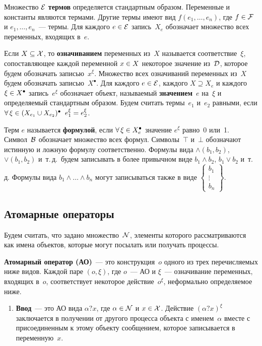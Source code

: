 \begin{multicols}{2}
Множество ${\cal E}$ {\bf термов} определяется стандартным образом.
Переменные и константы являются термами.
Другие термы имеют вид $f(e_1,\ldots, e_n)$, где
$f\hm\in {\cal F}$ и $e_1,\ldots, e_n$~--- термы.
Для каждого $e\hm\in {\cal E}$ запись~$X_e$ обозначает
множество всех переменных, входящих в~$e$.

Если $X\subseteq {\cal X}$, то {\bf означиванием} переменных из~$X$ называется соответствие~$\xi$,
сопоставляющее каж\-дой переменной $x \hm\in X$ некоторое значение из~${\cal D}$,
которое  будем обозначать записью~$x^\xi$.
Множество всех означиваний переменных из~$X$  будем обозначать
записью~$X^\bullet$. Для каждого $e\hm\in {\cal E}$,
каждого $X\supseteq X_e$ и каждого $\xi\hm\in X^\bullet$
запись~$e^\xi$ обозначает объект, называемый {\bf значением}~$e$ на~$\xi$
и определяемый стандартным образом.
Будем считать термы~$e_1$ и~$e_2$ равными, если
$\forall\,\xi\hm\in (X_{e_1}\cup X_{e_2})^\bullet\;\;
e_1^\xi\hm=e_2^\xi$.

Терм $e$ называется {\bf формулой}, если $\forall\,\xi\hm\in X_e^\bullet$
значение $e^\xi$ равно~0 или~1. Символ~${\cal B}$ обозначает множество всех формул.
Символы~$\top$ и~$\bot$ обозначают
истинную и ложную формулу соответственно. Формулы вида
$\wedge(b_1,b_2)$, $\vee(b_1,b_2)$ и~т.\,д.\ будем записывать в более
привычном виде $b_1\wedge b_2$, $b_1\vee b_2$ и~т.\,д. Формулы вида
$b_1\wedge \ldots\wedge b_n$ могут записываться также в виде
$\left\{
\begin{array}{c}
b_1\\[3pt] \vdots \\[3pt] b_n\end{array}\right\}$.

\subsection{Атомарные операторы}

Будем считать, что задано множество~${\cal N}$, элементы которого   рассматриваются
как имена объектов, которые могут посылать или получать про\-цессы.

{\bf Атомарный оператор (АО)}~---  это конструкция~$o$ одного из трех
перечисляемых ниже видов. Каждой паре $(o, \xi)$, где $o$~--- АО и
$\xi$~--- означивание переменных, входящих в~$o$,
соответствует  некоторое действие~$o^{\xi}$, неформально определяемое ниже.
\begin{enumerate}[1.]
\item
{\bf Ввод}~--- это АО вида $\alpha?x$, где $\alpha\hm\in  {\cal N}$
и $x \hm\in {\cal X}$. Действие
$(\alpha?x)^{\xi}$ заключается в получении от другого процесса
объекта с именем~$\alpha$ вместе с присоединенным к этому объекту сообщением,
которое записывается в  переменную~$x$.


\end{enumerate}
\end{multicols}
